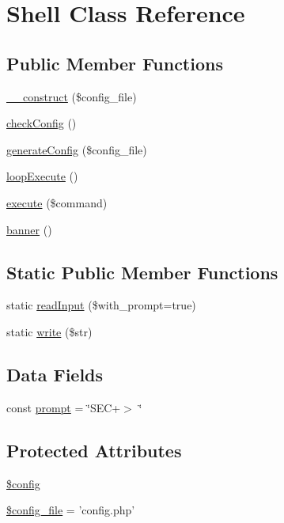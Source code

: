 \hypertarget{class_sec_plus_1_1_shell}{
\section{Shell Class Reference}
\label{class_sec_plus_1_1_shell}
}
\subsection*{Public Member Functions}
\begin{DoxyCompactItemize}
\item 
\hyperlink{class_sec_plus_1_1_shell_af088c93ce27768e9478939b542e02981}{\_\-\_\-construct} (\$config\_\-file)
\item 
\hyperlink{class_sec_plus_1_1_shell_a859cdb2c62ae762416b9967ea7a0633f}{checkConfig} ()
\item 
\hyperlink{class_sec_plus_1_1_shell_af8dcb49b25f712fdb5a54180db6f65aa}{generateConfig} (\$config\_\-file)
\item 
\hyperlink{class_sec_plus_1_1_shell_aeaeb60ae9f001fe9766fe94733babc5f}{loopExecute} ()
\item 
\hyperlink{class_sec_plus_1_1_shell_a5704439633de497abe437bb32a0d8de1}{execute} (\$command)
\item 
\hyperlink{class_sec_plus_1_1_shell_a71c184af60e335ef57f5840abb5315d6}{banner} ()
\end{DoxyCompactItemize}
\subsection*{Static Public Member Functions}
\begin{DoxyCompactItemize}
\item 
static \hyperlink{class_sec_plus_1_1_shell_aa9a85e2458f0594bf3962952436c2849}{readInput} (\$with\_\-prompt=true)
\item 
static \hyperlink{class_sec_plus_1_1_shell_acfb9193d68abf909ca80dbe45d53b9a1}{write} (\$str)
\end{DoxyCompactItemize}
\subsection*{Data Fields}
\begin{DoxyCompactItemize}
\item 
const \hyperlink{class_sec_plus_1_1_shell_aa58105470d0307085c38e19ee0a97975}{prompt} = \char`\"{}SEC+$>$ \char`\"{}
\end{DoxyCompactItemize}
\subsection*{Protected Attributes}
\begin{DoxyCompactItemize}
\item 
\hyperlink{class_sec_plus_1_1_shell_a49c7011be9c979d9174c52a8b83e5d8e}{\$config}
\item 
\hyperlink{class_sec_plus_1_1_shell_ae6059ea82d657151d1d5b4f5c5ef9177}{\$config\_\-file} = 'config.php'
\end{DoxyCompactItemize}


